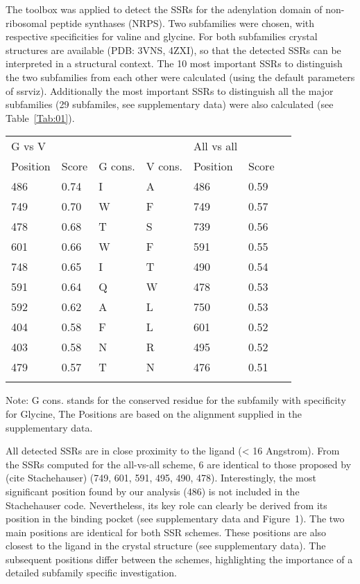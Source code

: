 \documentclass{bioinfo}
\begin{document}
The toolbox was applied to detect the SSRs for the adenylation domain of   
non-ribosomal peptide synthases (NRPS). 
Two subfamilies were chosen, with respective specificities 
for valine and glycine. 
For both subfamilies crystal structures are available (PDB: 3VNS, 4ZXI),
so that the detected SSRs can be interpreted in a structural context. 
The 10 most important SSRs to distinguish the two subfamilies from each other 
were calculated (using the default parameters of ssrviz). 
Additionally the most important SSRs
to distinguish all the major subfamilies (29 subfamiles, see supplementary data)
were also calculated (see Table~\ref{Tab:01}). \\
%
\begin{table}[!t]
{\begin{tabular}{@{}lllllll@{}}\toprule G vs V & & & & All vs all &  \\
Position  & Score & G cons. & V cons. & Position & Score \\\midrule
486 & 0.74& I & A & 486 & 0.59\\
749 & 0.70& W & F & 749 & 0.57\\
478 & 0.68& T & S & 739 & 0.56\\
601 & 0.66& W & F & 591 & 0.55\\
748 & 0.65& I & T & 490 & 0.54\\
591 & 0.64& Q & W & 478 & 0.53\\
592 & 0.62& A & L & 750 & 0.53\\
404 & 0.58& F & L & 601 & 0.52\\
403 & 0.58& N & R & 495 & 0.52\\
479 & 0.57& T & N & 476 & 0.51\\
\botrule
\end{tabular}}{Note: G cons. stands for the conserved residue for the subfamily with specificity for Glycine, The Positions are
based on the alignment supplied in the supplementary data.}
\end{table}
%
All detected SSRs are in close proximity to the ligand (< 16 Angstrom). 
From the SSRs computed for the all-vs-all scheme, 6 are identical to those 
proposed by (cite Stachehauser) (749, 601, 591, 495, 490, 478).
%
Interestingly, the most significant position found by our analysis (486) is not 
included in the Stachehauser code. Nevertheless, its key role can clearly be 
derived from its position in the binding pocket (see supplementary data and Figure~1\vphantom{\ref{fig:01}}).
%
The two main positions are identical for both SSR schemes. These positions are 
also closest to the ligand in the crystal structure (see supplementary data). 
The subsequent positions differ between the schemes, highlighting the 
importance of a detailed subfamily specific investigation. 
%
\end{document}
